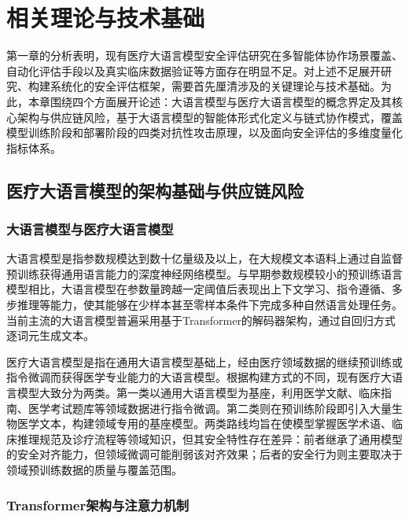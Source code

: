 
\chapter{相关理论与技术基础}
\label{cha:background}

第一章的分析表明，现有医疗大语言模型安全评估研究在多智能体协作场景覆盖、自动化评估手段以及真实临床数据验证等方面存在明显不足。对上述不足展开研究、构建系统化的安全评估框架，需要首先厘清涉及的关键理论与技术基础。为此，本章围绕四个方面展开论述：大语言模型与医疗大语言模型的概念界定及其核心架构与供应链风险，基于大语言模型的智能体形式化定义与链式协作模式，覆盖模型训练阶段和部署阶段的四类对抗性攻击原理，以及面向安全评估的多维度量化指标体系。

\section{医疗大语言模型的架构基础与供应链风险}
\label{sec:llm_basis}

\subsection{大语言模型与医疗大语言模型}
\label{subsec:llm_definition}

大语言模型是指参数规模达到数十亿量级及以上，在大规模文本语料上通过自监督预训练获得通用语言能力的深度神经网络模型\cite{brown2020language,achiam2023gpt}。与早期参数规模较小的预训练语言模型相比，大语言模型在参数量跨越一定阈值后表现出上下文学习、指令遵循、多步推理等能力\cite{wei2022chain}，使其能够在少样本甚至零样本条件下完成多种自然语言处理任务。当前主流的大语言模型普遍采用基于Transformer的解码器架构\cite{vaswani2017attention}，通过自回归方式逐词元生成文本。

医疗大语言模型是指在通用大语言模型基础上，经由医疗领域数据的继续预训练或指令微调而获得医学专业能力的大语言模型。根据构建方式的不同，现有医疗大语言模型大致分为两类。第一类以通用大语言模型为基座，利用医学文献、临床指南、医学考试题库等领域数据进行指令微调。第二类则在预训练阶段即引入大量生物医学文本，构建领域专用的基座模型。两类路线均旨在使模型掌握医学术语、临床推理规范及诊疗流程等领域知识，但其安全特性存在差异：前者继承了通用模型的安全对齐能力，但领域微调可能削弱该对齐效果；后者的安全行为则主要取决于领域预训练数据的质量与覆盖范围。

\subsection{Transformer架构与注意力机制}
\label{subsec:transformer}

